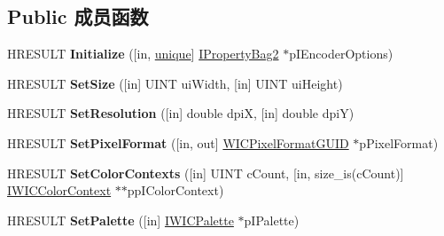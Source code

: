 \subsection*{Public 成员函数}
\begin{DoxyCompactItemize}
\item 
\mbox{\label{interface_i_w_i_c_bitmap_frame_encode_a254166e8c0ba5de12a2b9a449dd489dd}} 
H\+R\+E\+S\+U\+LT {\bfseries Initialize} (\mbox{[}in, \hyperlink{interfaceunique}{unique}\mbox{]} \hyperlink{interface_i_property_bag2}{I\+Property\+Bag2} $\ast$p\+I\+Encoder\+Options)
\item 
\mbox{\label{interface_i_w_i_c_bitmap_frame_encode_accb5428c336342016489be2e4a1caa13}} 
H\+R\+E\+S\+U\+LT {\bfseries Set\+Size} (\mbox{[}in\mbox{]} U\+I\+NT ui\+Width, \mbox{[}in\mbox{]} U\+I\+NT ui\+Height)
\item 
\mbox{\label{interface_i_w_i_c_bitmap_frame_encode_a2d3a068be61417410c975147d4e118a1}} 
H\+R\+E\+S\+U\+LT {\bfseries Set\+Resolution} (\mbox{[}in\mbox{]} double dpiX, \mbox{[}in\mbox{]} double dpiY)
\item 
\mbox{\label{interface_i_w_i_c_bitmap_frame_encode_a5eaff6a54dd0256254c5afb7bbb02ac5}} 
H\+R\+E\+S\+U\+LT {\bfseries Set\+Pixel\+Format} (\mbox{[}in, out\mbox{]} \hyperlink{interface_g_u_i_d}{W\+I\+C\+Pixel\+Format\+G\+U\+ID} $\ast$p\+Pixel\+Format)
\item 
\mbox{\label{interface_i_w_i_c_bitmap_frame_encode_a772d3fc1c6d88b6bc199d8ac0f5e723b}} 
H\+R\+E\+S\+U\+LT {\bfseries Set\+Color\+Contexts} (\mbox{[}in\mbox{]} U\+I\+NT c\+Count, \mbox{[}in, size\+\_\+is(c\+Count)\mbox{]} \hyperlink{interface_i_w_i_c_color_context}{I\+W\+I\+C\+Color\+Context} $\ast$$\ast$pp\+I\+Color\+Context)
\item 
\mbox{\label{interface_i_w_i_c_bitmap_frame_encode_a609fcac56e10d03db80ecafdf514b469}} 
H\+R\+E\+S\+U\+LT {\bfseries Set\+Palette} (\mbox{[}in\mbox{]} \hyperlink{interface_i_w_i_c_palette}{I\+W\+I\+C\+Palette} $\ast$p\+I\+Palette)
\item 
\mbox{\label{interface_i_w_i_c_bitmap_frame_encode_a3fa59c324d27e930b37a80eb79ac93b6}} 
$$
\end{DoxyCompactItemize}
